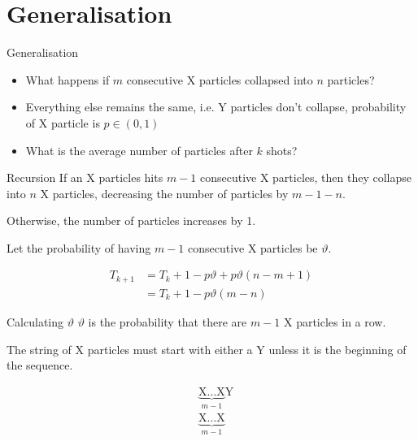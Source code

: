 \documentclass[xcolor={usenames,dvipsnames}]{beamer}
\begin{document}
\section{Generalisation}
\begin{frame}{Generalisation}
  \begin{itemize}
    \item What happens if $m$ consecutive X particles collapsed into $n$ particles?
    \item Everything else remains the same, i.e. Y particles don't collapse, probability of X particle is $p \in (0, 1)$
    \item What is the average number of particles after $k$ shots?
  \end{itemize}
\end{frame}

\begin{frame}{Recursion}
  If an X particles hits $m-1$ consecutive X particles, then they collapse into $n$ X particles, decreasing the number of particles by $m-1-n$.

  Otherwise, the number of particles increases by 1.

  Let the probability of having  $m-1$ consecutive X particles be $\vartheta$. 

  \begin{align*}
    T_{k+1} &= T_k + 1-p\vartheta + p\vartheta(n-m+1) \\
            &= T_k + 1 - p\vartheta(m - n)
  \end{align*}
\end{frame}
\begin{frame}{Calculating $\vartheta$}
  $\vartheta$ is the probability that there are $m-1$ X particles in a row.

  The string of X particles must start with either a Y unless it is the beginning of the sequence.
  \begin{figure}[H]
    \vspace{-1.5em}
    \begin{align*}
        &\underbrace{\text{X}\dots\text{X}}_{m-1}\text{Y} \tag{A}\\
        &\underbrace{\text{X}\dots\text{X}}_{m-1} \tag{B}
    \end{align*}
    \vspace{-2em}
  \end{figure}
\end{frame}
\end{document}
